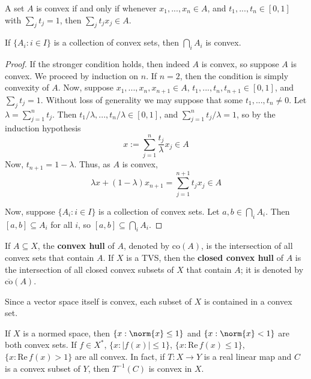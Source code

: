 \begin{prop}
    A set $A$ is convex if and only if whenever $x_1,...,x_n \in A$, and $t_1,...,t_n \in [0,1]$ with $\sum_jt_j = 1$, then $\sum_jt_jx_j \in A$. 

    If $\{A_i:i \in I\}$ is a collection of convex sets, then $\bigcap_iA_i$ is convex.
\end{prop}
\begin{proof}
    If the stronger condition holds, then indeed $A$ is convex, so suppose $A$ is convex. We proceed by induction on $n$. If $n = 2$, then the condition is simply convexity of $A$. Now, suppose $x_1,...,x_n,x_{n+1} \in A$, $t_1,...,t_n,t_{n+1} \in [0,1]$, and $\sum_jt_j = 1$. Without loss of generality we may suppose that some $t_1,...,t_n \neq 0$. Let $\lambda = \sum_{j=1}^nt_j$. Then $t_1/\lambda,...,t_n/\lambda \in [0,1]$, and $\sum_{j=1}^nt_j/\lambda = 1$, so by the induction hypothesis $$x:=\sum_{j=1}^n\frac{t_j}{\lambda}x_j \in A$$
    Now, $t_{n+1} = 1-\lambda$. Thus, as $A$ is convex, $$\lambda x + (1-\lambda)x_{n+1} = \sum_{j=1}^{n+1}t_jx_j \in A$$

    Now, suppose $\{A_i:i\in I\}$ is a collection of convex sets. Let $a,b \in \bigcap_iA_i$. Then $[a,b] \subseteq A_i$ for all $i$, so $[a,b] \subseteq \bigcap_iA_i$.
\end{proof}

\begin{defn}
    If $A \subseteq X$, the \textbf{convex hull} of $A$, denoted by $\text{co}(A)$, is the intersection of all convex sets that contain $A$. If $X$ is a TVS, then the \textbf{closed convex hull} of $A$ is the intersection of all closed convex subsets of $X$ that contain $A$; it is denoted by $\overline{\text{co}}(A)$.
\end{defn}

Since a vector space itself is convex, each subset of $X$ is contained in a convex set.

If $X$ is a normed space, then $\{x:\norm{x}\leq 1\}$ and $\{x:\norm{x} < 1\}$ are both convex sets. If $f \in X^*$, $\{x:|f(x)| \leq 1\}$, $\{x:\text{Re}\,f(x)\leq 1\}$, $\{x:\text{Re}\,f(x) > 1\}$ are all convex. In fact, if $T:X\rightarrow Y$ is a real linear map and $C$ is a convex subset of $Y$, then $T^{-1}(C)$ is convex in $X$.

